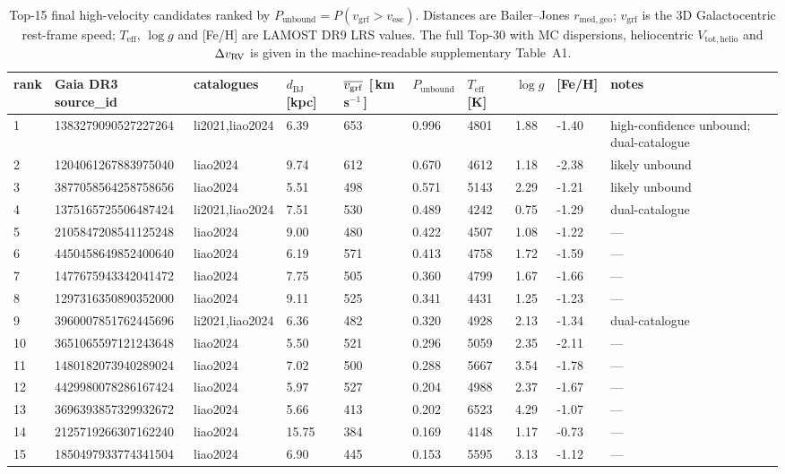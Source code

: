 \begin{table}
\caption{Top-15 final high-velocity candidates ranked by $P_\mathrm{unbound}=P(v_\mathrm{grf}>v_\mathrm{esc})$. Distances are Bailer--Jones $r_\mathrm{med,geo}$; $v_\mathrm{grf}$ is the 3D Galactocentric rest-frame speed; $T_\mathrm{eff}$, $\log g$ and [Fe/H] are LAMOST DR9 LRS values. The full Top-30 with MC dispersions, heliocentric $V_\mathrm{tot,helio}$ and $\Delta v_{\rm RV}$ is given in the machine-readable supplementary Table~A1.}
\label{tab:top15}
\begin{tabular}{llllllllll}
\toprule
rank & Gaia DR3 source\_id & catalogues & $d_\mathrm{BJ}$ [kpc] & $\overline{v_{\rm grf}}$ [\,km\,s$^{-1}$\,] & $P_\mathrm{unbound}$ & $T_\mathrm{eff}$ [K] & $\log g$ & [Fe/H] & notes \\
\midrule
1 & 1383279090527227264 & li2021,liao2024 & 6.39 & 653 & 0.996 & 4801 & 1.88 & -1.40 & high-confidence unbound; dual-catalogue \\
2 & 1204061267883975040 & liao2024 & 9.74 & 612 & 0.670 & 4612 & 1.18 & -2.38 & likely unbound \\
3 & 3877058564258758656 & liao2024 & 5.51 & 498 & 0.571 & 5143 & 2.29 & -1.21 & likely unbound \\
4 & 1375165725506487424 & li2021,liao2024 & 7.51 & 530 & 0.489 & 4242 & 0.75 & -1.29 & dual-catalogue \\
5 & 2105847208541125248 & liao2024 & 9.00 & 480 & 0.422 & 4507 & 1.08 & -1.22 & --- \\
6 & 4450458649852400640 & liao2024 & 6.19 & 571 & 0.413 & 4758 & 1.72 & -1.59 & --- \\
7 & 1477675943342041472 & liao2024 & 7.75 & 505 & 0.360 & 4799 & 1.67 & -1.66 & --- \\
8 & 1297316350890352000 & liao2024 & 9.11 & 525 & 0.341 & 4431 & 1.25 & -1.23 & --- \\
9 & 3960007851762445696 & li2021,liao2024 & 6.36 & 482 & 0.320 & 4928 & 2.13 & -1.34 & dual-catalogue \\
10 & 3651065597121243648 & liao2024 & 5.50 & 521 & 0.296 & 5059 & 2.35 & -2.11 & --- \\
11 & 1480182073940289024 & liao2024 & 7.02 & 500 & 0.288 & 5667 & 3.54 & -1.78 & --- \\
12 & 4429980078286167424 & liao2024 & 5.97 & 527 & 0.204 & 4988 & 2.37 & -1.67 & --- \\
13 & 3696393857329932672 & liao2024 & 5.66 & 413 & 0.202 & 6523 & 4.29 & -1.07 & --- \\
14 & 2125719266307162240 & liao2024 & 15.75 & 384 & 0.169 & 4148 & 1.17 & -0.73 & --- \\
15 & 1850497933774341504 & liao2024 & 6.90 & 445 & 0.153 & 5595 & 3.13 & -1.12 & --- \\
\bottomrule
\end{tabular}
\end{table}

